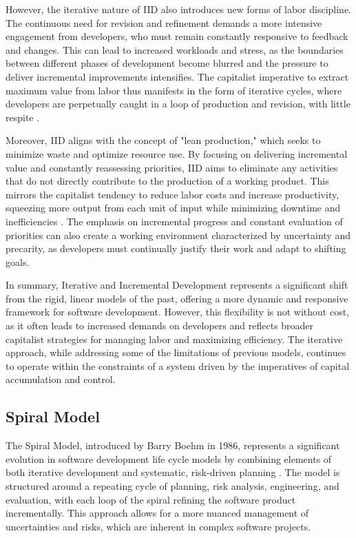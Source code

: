 \begin{refsection}
However, the iterative nature of IID also introduces new forms of labor discipline. The continuous need for revision and refinement demands a more intensive engagement from developers, who must remain constantly responsive to feedback and changes. This can lead to increased workloads and stress, as the boundaries between different phases of development become blurred and the pressure to deliver incremental improvements intensifies. The capitalist imperative to extract maximum value from labor thus manifests in the form of iterative cycles, where developers are perpetually caught in a loop of production and revision, with little respite \cite[pp.~101-104]{Conradi2003}.

Moreover, IID aligns with the concept of "lean production," which seeks to minimize waste and optimize resource use. By focusing on delivering incremental value and constantly reassessing priorities, IID aims to eliminate any activities that do not directly contribute to the production of a working product. This mirrors the capitalist tendency to reduce labor costs and increase productivity, squeezing more output from each unit of input while minimizing downtime and inefficiencies \cite[pp.~56-59]{Womack1991}. The emphasis on incremental progress and constant evaluation of priorities can also create a working environment characterized by uncertainty and precarity, as developers must continually justify their work and adapt to shifting goals.

In summary, Iterative and Incremental Development represents a significant shift from the rigid, linear models of the past, offering a more dynamic and responsive framework for software development. However, this flexibility is not without cost, as it often leads to increased demands on developers and reflects broader capitalist strategies for managing labor and maximizing efficiency. The iterative approach, while addressing some of the limitations of previous models, continues to operate within the constraints of a system driven by the imperatives of capital accumulation and control.

\subsection{Spiral Model}

The Spiral Model, introduced by Barry Boehm in 1986, represents a significant evolution in software development life cycle models by combining elements of both iterative development and systematic, risk-driven planning \cite[pp.~61-65]{Boehm1988}. The model is structured around a repeating cycle of planning, risk analysis, engineering, and evaluation, with each loop of the spiral refining the software product incrementally. This approach allows for a more nuanced management of uncertainties and risks, which are inherent in complex software projects.


\end{refsection}
